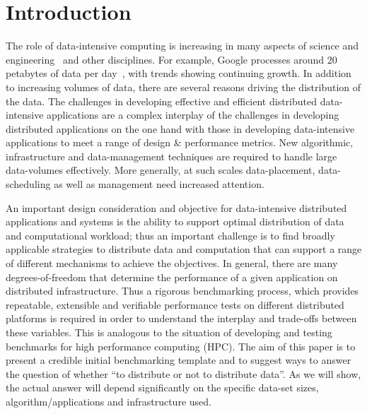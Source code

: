 \documentclass{rspublic}
\begin{document}
\section{Introduction} 

The role of data-intensive computing is increasing in many aspects of
science and engineering~\citep{fourthparadigm} and other
disciplines. For example, Google processes around 20 petabytes of
data per day~\citep{google}, with trends showing continuing
growth. In addition to increasing volumes of data, there are several
reasons driving the distribution of the data.  The challenges in
developing effective and efficient distributed data-intensive
applications are a complex interplay of the challenges in developing
distributed applications on the one hand with those in developing
data-intensive applications to meet a range of design \& performance
metrics. New algorithmic, infrastructure and data-management
techniques are required to handle large data-volumes effectively. More
generally, at such scales data-placement, data-scheduling as well as
management need increased attention.

An important design consideration and objective for data-intensive
distributed applications and systems is the ability to support optimal
distribution of data and computational workload; thus an important
challenge is to find broadly applicable strategies to distribute data
and computation that can support a range of different mechanisms to
achieve the objectives. In general, there are many degrees-of-freedom
that determine the performance of a given application on distributed
infrastructure. Thus a rigorous benchmarking process, which provides
repeatable, extensible and verifiable performance tests on different
distributed platforms is required in order to understand the interplay
and trade-offs between these variables. This is analogous to the
situation of developing and testing benchmarks for high performance
computing (HPC). The aim of this paper is to present a credible
initial benchmarking template and to suggest ways to answer the
question of whether ``to distribute or not to distribute data''.  As
we will show, the actual answer will depend significantly on the
specific data-set sizes, algorithm/applications and infrastructure
used.
\end{document}
